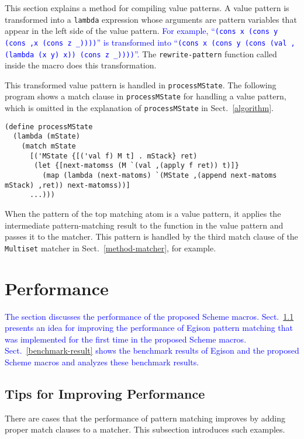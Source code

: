 \documentclass[acmlarge]{acmart}
\newcommand{\new}[1]{\textcolor{blue}{#1}}
\begin{document}
This section explains a method for compiling value patterns.
A value pattern is transformed into a \lstinline{lambda} expression whose arguments are pattern variables that appear in the left side of the value pattern.
\new{
For example, ``\lstinline{(cons x (cons y (cons ,x (cons z _))))}'' is transformed into ``\lstinline{(cons x (cons y (cons (val ,(lambda (x y) x)) (cons z _))))}''.
}%
The \lstinline{rewrite-pattern} function called inside the macro does this transformation.

This transformed value pattern is handled in \lstinline{processMState}.
The following program shows a match clause in \lstinline{processMState} for handling a value pattern, which is omitted in the explanation of \lstinline{processMState} in Sect.~\ref{algorithm}.

\begin{lstlisting}[language=egison]
(define processMState
  (lambda (mState)
    (match mState
      [('MState {[('val f) M t] . mStack} ret)
       (let {[next-matomss (M `(val ,(apply f ret)) t)]}
         (map (lambda (next-matoms) `(MState ,(append next-matoms mStack) ,ret)) next-matomss))]
      ...)))
\end{lstlisting}

\noindent
When the pattern of the top matching atom is a value pattern, it applies the intermediate pattern-matching result to the function in the value pattern and passes it to the matcher.
This pattern is handled by the third match clause of the \lstinline{Multiset} matcher in Sect.~\ref{method-matcher}, for example.

\section{Performance}\label{performance}

\new{
The section discusses the performance of the proposed Scheme macros.
Sect.~\ref{tip} presents an idea for improving the performance of Egison pattern matching that was implemented for the first time in the proposed Scheme macros.
Sect.~\ref{benchmark-result} shows the benchmark results of Egison and the proposed Scheme macros and analyzes these benchmark results.
}%

\subsection{Tips for Improving Performance}\label{tip}

There are cases that the performance of pattern matching improves by adding proper match clauses to a matcher.
This subsection introduces such examples.
\end{document}

